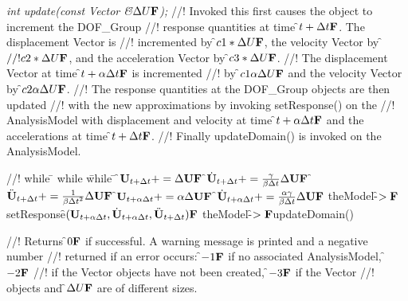 {\em int update(const Vector \&\f$\Delta U{\bf F}$);}
//! Invoked this first causes the object to increment the DOF\_Group
//! response quantities at time \f$t + \Delta t{\bf F}$. The displacement Vector is  
//! incremented by \f$ c1 * \Delta U{\bf F}$, the velocity Vector by \f$
//! c2 * \Delta U{\bf F}$, and the acceleration Vector by \f$c3 * \Delta U{\bf F}$. 
//! The displacement Vector at time \f$t + \alpha \Delta t{\bf F}$ is incremented
//! by \f$c1 \alpha \Delta U{\bf F}$ and the velocity Vector by \f$c2 \alpha \Delta U{\bf F}$.
//! The response quantities at the DOF\_Group objects are then updated
//! with the new approximations by invoking setResponse() on the
//! AnalysisModel with displacement and velocity at time \f$t + \alpha
\Delta t{\bf F}$ and the accelerations at time \f$t + \Delta t{\bf F}$. 
//! Finally updateDomain() is invoked on the AnalysisModel. 
\begin{tabbing}
//! while \= \+ while \= while \= \kill
\>\> \f$ {\bf U}_{t + \Delta t} += \Delta {\bf U}{\bf F}$
\>\> \f$ \dot {{\bf U}}_{t + \Delta t} += \frac{\gamma}{\beta \Delta t} \Delta {\bf U} {\bf F}$
\>\> \f$ \ddot {{\bf U}}_{t + \Delta t} += \frac{1}{\beta {\Delta t}^2} \Delta {\bf U} {\bf F}$
\>\> \f$ {\bf U}_{t + \alpha \Delta t} += \alpha \Delta {\bf U} {\bf F}$
\>\> \f$ \dot{\bf U}_{t + \alpha \Delta t} += \frac{\alpha \gamma}{\beta \Delta t}
\Delta {\bf U} {\bf F}$ 
\>\> theModel-\f$>{\bf F}$setResponse\f$({\bf U}_{t + \alpha \Delta t}, \dot{\bf U}_{t+\alpha
\Delta t}, \ddot{\bf U}_{t+\Delta t}){\bf F}$
\>\> theModel-\f$>{\bf F}$updateDomain()
\end{tabbing}
//! Returns
\f$0{\bf F}$ if successful. A warning message is printed and a negative number
//! returned if an error occurs: \f$-1{\bf F}$ if no associated AnalysisModel, \f$-2{\bf F}$
//! if the Vector objects have not been created, \f$-3{\bf F}$ if the Vector
//! objects and \f$\Delta U{\bf F}$ are of different sizes.


